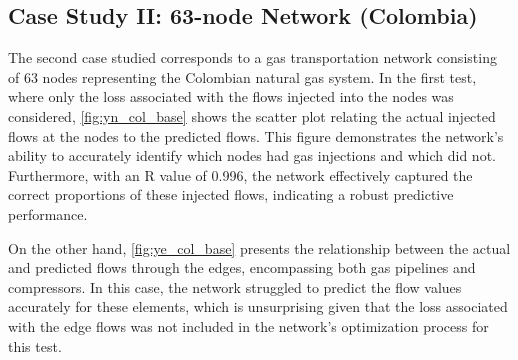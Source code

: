%
%
%

\subsection{Case Study II: 63-node Network (Colombia)}


The second case studied corresponds to a gas transportation network consisting of 63 nodes representing the Colombian natural gas system. In the first test, where only the loss associated with the flows injected into the nodes was considered, \cref{fig:yn_col_base} shows the scatter plot relating the actual injected flows at the nodes to the predicted flows. This figure demonstrates the network's ability to accurately identify which nodes had gas injections and which did not. Furthermore, with an R value of 0.996, the network effectively captured the correct proportions of these injected flows, indicating a robust predictive performance. 

On the other hand, \cref{fig:ye_col_base} presents the relationship between the actual and predicted flows through the edges, encompassing both gas pipelines and compressors. In this case, the network struggled to predict the flow values accurately for these elements, which is unsurprising given that the loss associated with the edge flows was not included in the network's optimization process for this test.


\begin{figure}
    \centering
        \setlength{}        
        \setlength{} 
    \caption{}\label{fig:}
\end{figure}

